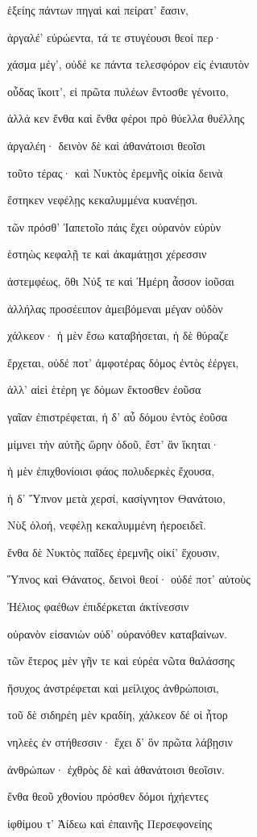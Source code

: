 \begin{pages}
\begin{Leftside}
ἑξείης πάντων πηγαὶ καὶ πείρατ' ἔασιν,

ἀργαλέ' εὐρώεντα, τά τε στυγέουσι θεοί περ·

χάσμα μέγ', οὐδέ κε πάντα τελεσφόρον εἰς ἐνιαυτὸν 

οὖδας ἵκοιτ', εἰ πρῶτα πυλέων ἔντοσθε γένοιτο,

ἀλλά κεν ἔνθα καὶ ἔνθα φέροι πρὸ θύελλα θυέλλης 

ἀργαλέη· δεινὸν δὲ καὶ ἀθανάτοισι θεοῖσι 

τοῦτο τέρας· καὶ Νυκτὸς ἐρεμνῆς οἰκία δεινὰ

ἕστηκεν νεφέλῃς κεκαλυμμένα κυανέῃσι.  

τῶν πρόσθ' Ἰαπετοῖο πάις ἔχει οὐρανὸν εὐρὺν

ἑστηὼς κεφαλῇ τε καὶ ἀκαμάτῃσι χέρεσσιν

ἀστεμφέως, ὅθι Νύξ τε καὶ Ἡμέρη ἆσσον ἰοῦσαι

ἀλλήλας προσέειπον ἀμειβόμεναι μέγαν οὐδὸν 

χάλκεον· ἡ μὲν ἔσω καταβήσεται, ἡ δὲ θύραζε  

ἔρχεται, οὐδέ ποτ' ἀμφοτέρας δόμος ἐντὸς ἐέργει,

ἀλλ' αἰεὶ ἑτέρη γε δόμων ἔκτοσθεν ἐοῦσα

γαῖαν ἐπιστρέφεται, ἡ δ' αὖ δόμου ἐντὸς ἐοῦσα 

μίμνει τὴν αὐτῆς ὥρην ὁδοῦ, ἔστ' ἂν ἵκηται· 

ἡ μὲν ἐπιχθονίοισι φάος πολυδερκὲς ἔχουσα,  

ἡ δ' Ὕπνον μετὰ χερσί, κασίγνητον Θανάτοιο, 

Νὺξ ὀλοή, νεφέλῃ κεκαλυμμένη ἠεροειδεῖ.

ἔνθα δὲ Νυκτὸς παῖδες ἐρεμνῆς οἰκί' ἔχουσιν,

Ὕπνος καὶ Θάνατος, δεινοὶ θεοί· οὐδέ ποτ' αὐτοὺς 

Ἠέλιος φαέθων ἐπιδέρκεται ἀκτίνεσσιν 

οὐρανὸν εἰσανιὼν οὐδ' οὐρανόθεν καταβαίνων. 

τῶν ἕτερος μὲν γῆν τε καὶ εὐρέα νῶτα θαλάσσης 

ἥσυχος ἀνστρέφεται καὶ μείλιχος ἀνθρώποισι,

τοῦ δὲ σιδηρέη μὲν κραδίη, χάλκεον δέ οἱ ἦτορ

νηλεὲς ἐν στήθεσσιν· ἔχει δ' ὃν πρῶτα λάβῃσιν  

ἀνθρώπων· ἐχθρὸς δὲ καὶ ἀθανάτοισι θεοῖσιν. 

ἔνθα θεοῦ χθονίου πρόσθεν δόμοι ἠχήεντες

ἰφθίμου τ' Ἀίδεω καὶ ἐπαινῆς Περσεφονείης


\end{Leftside}
\end{pages}
